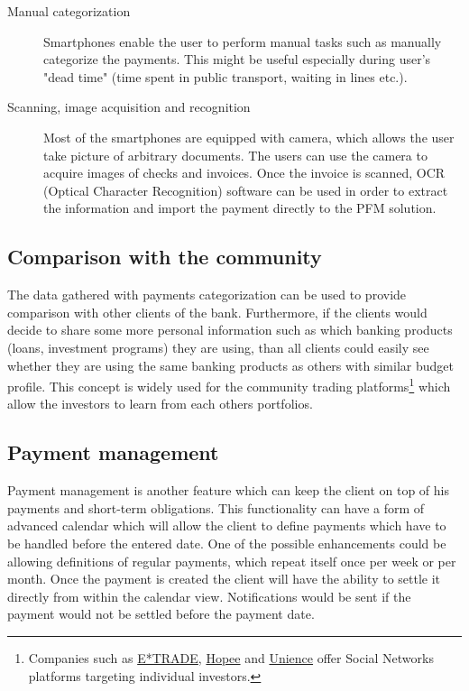 \begin{description}
	\item [Manual categorization]
	
	Smartphones enable the user to perform manual tasks such as manually categorize the payments. This might be useful especially during user's "dead time" (time spent in public transport, waiting in lines etc.).
	\item [Scanning, image acquisition and recognition]
	
	Most of the smartphones are equipped with camera, which allows the user take picture of arbitrary documents. The users can use the camera to acquire images of checks and invoices. Once the invoice is scanned, OCR (Optical Character Recognition) software can be used in order to extract the information and import the payment directly to the PFM solution.		
	
\end{description}

\subsection{Comparison with the community}
The data gathered with payments categorization can be used to provide comparison with other clients of the bank. Furthermore, if the clients would decide to share some more personal information such as which banking products (loans, investment programs) they are using, than all clients could easily see whether they are using the same banking products as others with similar budget profile. This concept is widely used for the community trading platforms\footnote{Companies such as \href{https://us.etrade.com/e/t/home}{E*TRADE}, \href{http://hopee.fr.sharewise.com/browse/hopee}{Hopee} and \href{https://www.unience.com/}{Unience} offer Social Networks platforms targeting individual investors.} which allow the investors to learn from each others portfolios.

\subsection{Payment management}
Payment management is another feature which can keep the client on top of his payments and short-term obligations. This functionality can have a form of advanced calendar which will allow the client to define payments which have to be handled before the entered date. One of the possible enhancements could be allowing definitions of regular payments, which repeat itself once per week or per month. Once the payment is created the client will have the ability to settle it directly from within the calendar view. Notifications would be sent if the payment would not be settled before the payment date.

